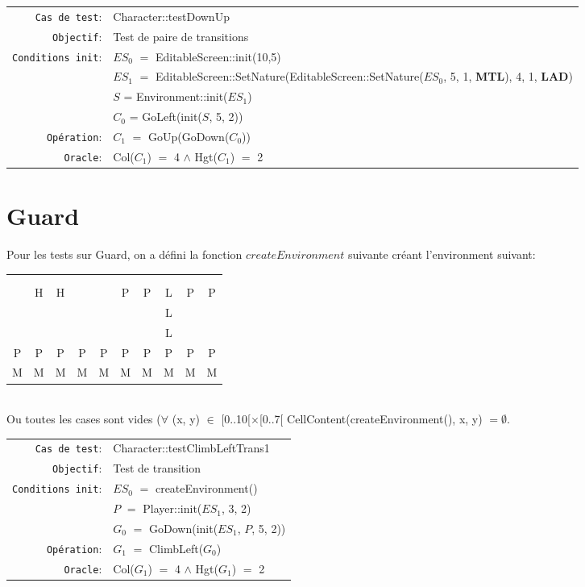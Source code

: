\documentclass{article}
\begin{document}
{\small
  \begin{longtable}{rl}
    \texttt{Cas de test}: &\textrm{Character::testDownUp}\\
    \texttt{Objectif}: & Test de paire de transitions\\
    \texttt{Conditions init}: & $ES_0$ $=$ \textrm{EditableScreen::init(10,5)}\\
    & $ES_1$ $=$ \textrm{EditableScreen::SetNature(EditableScreen::SetNature($ES_0$, 5, 1, \textbf{MTL}), 4, 1, \textbf{LAD})}\\
    & $S$ = \textrm{Environment::init($ES_1$)}\\
    & $C_0$ = \textrm{GoLeft(init($S$, 5, 2))}\\
    \texttt{Opération}: &$C_1$ $=$ \textrm{GoUp(GoDown($C_0$))}\\
    \texttt{Oracle}: &\textrm{Col($C_1$)} $=$ 4 $\land$ \textrm{Hgt($C_1$)} $=$ 2\\
  \end{longtable}}

\section{Guard}

Pour les tests sur Guard, on a défini la fonction $createEnvironment$ suivante créant l'environment suivant:\\
\begin{tabular}{cccccccccc}
   & & & & & & & & & \\
   & & & & & & & & & \\
   &H&H& & &P&P&L&P&P\\
   & & & & & & &L& & \\
   & & & & & & &L& & \\
  P&P&P&P&P&P&P&P&P&P\\
  M&M&M&M&M&M&M&M&M&M
\end{tabular}\\
\noindent Ou toutes les cases sont vides ($\forall$ (x, y) $\in$ [0..10[$\times$[0..7[ \textrm{CellContent(createEnvironment(), x, y)} $= \emptyset$.

{\small
  \begin{longtable}{rl}
    \texttt{Cas de test}: &\textrm{Character::testClimbLeftTrans1}\\
    \texttt{Objectif}: & Test de transition \\
    \texttt{Conditions init}: & $ES_0$ $=$ \textrm{createEnvironment()}\\
    & $P$ $=$ \textrm{Player::init($ES_1$, 3, 2)}\\
    & $G_0$ $=$ \textrm{GoDown(init($ES_1$, $P$, 5, 2))}\\
    \texttt{Opération}: &$G_1$ $=$ \textrm{ClimbLeft($G_0$)}\\
    \texttt{Oracle}: &\textrm{Col($G_1$)} $=$ 4 $\land$ \textrm{Hgt($G_1$)} $=$ 2\\
  \end{longtable}}
\end{document}
